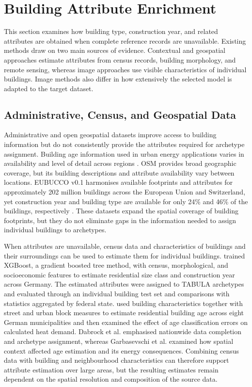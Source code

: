 \section{Building Attribute Enrichment}
\label{sec:building_attribute_enrichment}

This section examines how building type, construction year, and related attributes are obtained when complete reference records are unavailable. Existing methods draw on two main sources of evidence. Contextual and geospatial approaches estimate attributes from census records, building morphology, and remote sensing, whereas image approaches use visible characteristics of individual buildings. Image methods also differ in how extensively the selected model is adapted to the target dataset.

\subsection{Administrative, Census, and Geospatial Data}
\label{sec:administrative_geospatial_data}

Administrative and open geospatial datasets improve access to building information but do not consistently provide the attributes required for archetype assignment. Building age information used in urban energy applications varies in availability and level of detail across regions \parencite{garbasevschi2021}. \Ac{OSM} provides broad geographic coverage, but its building descriptions and attribute availability vary between locations. EUBUCCO v0.1 harmonises available footprints and attributes for approximately 202 million buildings across the European Union and Switzerland, yet construction year and building type are available for only 24\% and 46\% of the buildings, respectively \parencite{milojevicdupont2023}. These datasets expand the spatial coverage of building footprints, but they do not eliminate gaps in the information needed to assign individual buildings to archetypes.

When attributes are unavailable, census data and characteristics of buildings and their surroundings can be used to estimate them for individual buildings. \textcite{dabrock2025} trained XGBoost, a gradient boosted tree method, with census, morphological, and socioeconomic features to estimate residential size class and construction year across Germany. The estimated attributes were assigned to TABULA archetypes and evaluated through an individual building test set and comparisons with statistics aggregated by federal state. \textcite{garbasevschi2021} used building characteristics together with street and urban block measures to estimate residential building age across eight German municipalities and then examined the effect of age classification errors on calculated heat demand. Dabrock et al. emphasised nationwide data completion and archetype assignment, whereas Garbasevschi et al. examined how spatial context affected age estimation and its energy consequences. Combining census data with building and neighbourhood characteristics can therefore support attribute estimation over large areas, but the resulting estimates remain dependent on the spatial resolution and composition of the source data.

